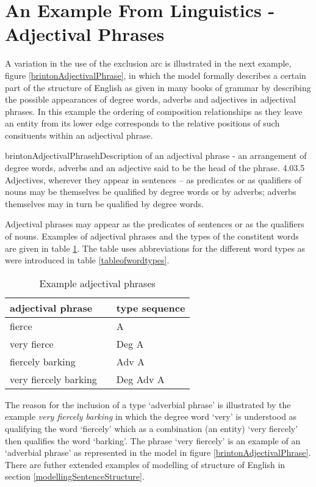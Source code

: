 \section{An Example From Linguistics - Adjectival Phrases}

\noindent A variation in the use of the exclusion arc is illustrated in the next example, figure \ref{brintonAdjectivalPhrase}, in which the model formally describes a certain part of the structure of English as given in many books of grammar by describing the possible appearances of degree words, adverbs and adjectives in adjectival phrases. In this example the ordering of composition relationships as they leave an entity from its lower edge corresponds to the relative positions of such consituents within an adjectival phrase. \\

\begin{ernotedDimFig}{brintonAdjectivalPhrase}{h}{Description of an adjectival phrase - an arrangement of degree words, adverbs and an adjective said to be the head of the phrase. }{4.0}{3.5}
Adjectives, wherever they appear in sentences – as predicates or as qualifiers of nouns may be themselves be qualified by degree words or by adverbs; adverbs themselves may in turn be qualified by degree words. 
\end{ernotedDimFig}

\noindent Adjectival phrases may appear as the predicates of sentences or as the qualifiers of nouns. Examples of adjectival phrases and the types of the constitent words are given in table \ref{exampleAdjectivalPhrases}. The table uses abbreviations for the different word types as were introduced in table \ref{tableofwordtypes}.


\begin{table}[h]
\centering
\begin{tabular} {l c l}
adjectival phrase& & type sequence\\
\hline 
fierce & &  A \\
very fierce & & Deg A \\
fiercely barking & & Adv A  \\
very fiercely barking & & Deg Adv A  \\
\end{tabular}
\caption{Example adjectival phrases}
\label {exampleAdjectivalPhrases}
\end{table} 


\noindent The reason for the inclusion of a type `adverbial phrase' is illustrated by the example \textit{very fiercely barking} in which the degree word `very' is understood as qualifying the word `fiercely' which as a combination (an entity) `very fiercely' then qualifies the word `barking'.
The phrase `very fiercely' is an example of an `adverbial phrase' as represented in the model in figure \ref{brintonAdjectivalPhrase}. 
\noindent There are futher extended examples of modelling of structure of English in section \ref{modellingSentenceStructure}.

